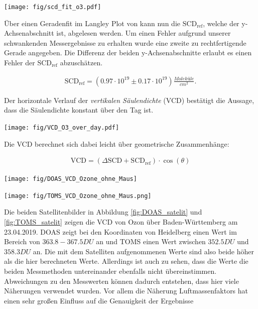 \documentclass[12pt, a4paper, bibliography=totoc]{scrartcl}
\begin{document}
\begin{multicols}{2}
\begin{center}
	\texttt{[image: fig/scd\_fit\_o3.pdf]}
	\label{fig:scd_fit_o3}
\end{center}

Über einen Geradenfit im Langley Plot von  kann nun die $\text{SCD}_\text{ref}$, welche der y-Achsenabschnitt ist, abgelesen werden. Um einen Fehler aufgrund unserer schwankenden Messergebnisse zu erhalten wurde eine zweite zu rechtfertigende Gerade angegeben. Die Differenz der beiden y-Achsenabschnitte erlaubt es einen Fehler der $\text{SCD}_\text{ref}$ abzuschätzen.
 
\begin{align}
	\text{SCD}_\text{ref}= (0.97 \cdot 10^{19}\pm 0.17 \cdot 10^{19}) \si{\frac{Moleküle}{cm^2}}.
\end{align}	

Der horizontale Verlauf der \textit{vertikalen Säulendichte} (VCD) bestätigt die Aussage, dass die  Säulendichte konstant über den Tag ist.

\begin{center}
	\texttt{[image: fig/VCD\_O3\_over\_day.pdf]}
	\label{fig:VCD_O3_over_day}
\end{center} 

Die VCD berechnet sich dabei leicht über geometrische Zusammenhänge: 

\begin{align}
    \text{VCD} = ( \Delta \text{SCD} + \text{SCD}_\text{ref}) \cdot \cos(\theta)
\end{align}

\begin{center}
	\texttt{[image: fig/DOAS\_VCD\_Ozone\_ohne\_Maus]}
	\label{fig:DOAS_satelit}
\end{center} 

\begin{center}
	\texttt{[image: fig/TOMS\_VCD\_Ozone\_ohne\_Maus.png]}
	\label{fig:TOMS_satelit}
\end{center} 
Die beiden Satellitenbilder in Abbildung \ref{fig:DOAS_satelit} und \ref{fig:TOMS_satelit} zeigen die VCD von Ozon über Baden-Württemberg am 23.04.2019.
DOAS zeigt bei den Koordinaten von Heidelberg einen Wert im Bereich von $363.8 - 367.5 \si{DU}$ an und TOMS einen Wert zwischen $352.5 \si{DU}$ und $358.3 \si{DU}$ an.
Die mit dem Satelliten aufgenommenen Werte sind also beide höher als die hier berechneten Werte.
Allerdings ist auch zu sehen, dass die Werte die beiden Messmethoden untereinander ebenfalls nicht übereinstimmen.
Abweichungen zu den Messwerten können dadurch entstehen, dass hier viele Näherungen verwendet wurden.
Vor allem die Näherung Luftmassenfaktors hat einen sehr großen Einfluss auf die Genauigkeit der Ergebnisse


\end{multicols}
\end{document}
